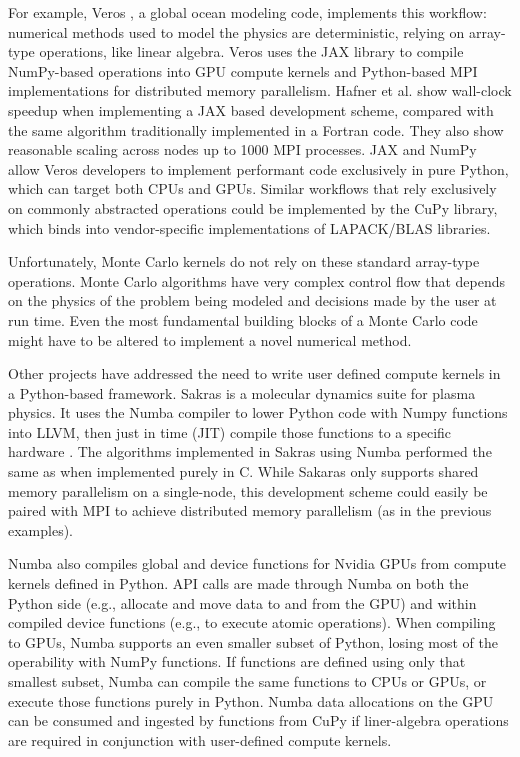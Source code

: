 For example, Veros \cite{hafner_fast_2021}, a global ocean modeling code, implements this workflow:
numerical methods used to model the physics are deterministic, relying on array-type operations, like linear algebra. 
Veros uses the JAX library \cite{jax2018github} to compile NumPy-based operations into GPU compute kernels and Python-based MPI implementations for distributed memory parallelism. 
Hafner et al. \cite{hafner_fast_2021} show wall-clock speedup when implementing a JAX based development scheme, compared with the same algorithm traditionally implemented in a Fortran code.
They also show reasonable scaling across nodes up to 1000 MPI processes. 
JAX and NumPy allow Veros developers to implement performant code exclusively in pure Python, which can target both CPUs and GPUs.
Similar workflows that rely exclusively on commonly abstracted operations could be implemented by the CuPy \cite{cupy_learningsys2017} library, which binds into vendor-specific implementations of LAPACK/BLAS libraries.

Unfortunately, Monte Carlo kernels do not rely on these standard array-type operations.
Monte Carlo algorithms have very complex control flow that depends on the physics of the problem being modeled and decisions made by the user at run time. 
Even the most fundamental building blocks of a Monte Carlo code might have to be altered to implement a novel numerical method.

Other projects have addressed the need to write user defined compute kernels in a Python-based framework.
Sakras \cite{silvestri_sarkas_2022} is a molecular dynamics suite for plasma physics. 
It uses the Numba compiler to lower Python code with Numpy functions into LLVM, then just in time (JIT) compile those functions to a specific hardware \cite{lam_numba_2015}. 
The algorithms implemented in Sakras using Numba performed the same as when implemented purely in C.
While Sakaras only supports shared memory parallelism on a single-node, this development scheme could easily be paired with MPI to achieve distributed memory parallelism (as in the previous examples). 

Numba also compiles global and device functions for Nvidia GPUs from compute kernels defined in Python.
API calls are made through Numba on both the Python side (e.g., allocate and move data to and from the GPU) and within compiled device functions (e.g., to execute atomic operations).
When compiling to GPUs, Numba supports an even smaller subset of Python, losing most of the operability with NumPy functions.
If functions are defined using only that smallest subset, Numba can compile the same functions to CPUs or GPUs, or execute those functions purely in Python.
Numba data allocations on the GPU can be consumed and ingested by functions from CuPy if liner-algebra operations are required in conjunction with user-defined compute kernels.

